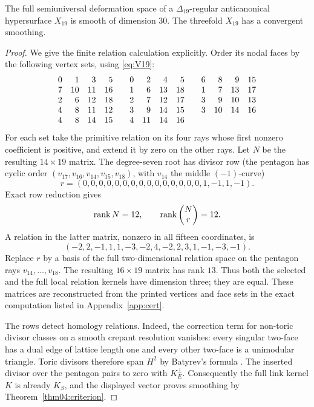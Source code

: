 \begin{corollary}\label{cor:x19smooth}
The full semiuniversal deformation space of a $\Delta_{19}$-regular
anticanonical hypersurface $X_{19}$ is smooth of dimension $30$.
The threefold $X_{19}$ has a convergent smoothing.
\end{corollary}

\begin{proof}
We give the finite relation calculation explicitly.  Order its nodal
faces by the following vertex sets, using \eqref{eq:V19}:
\[
\begin{array}{rrrr@{\qquad}rrrr@{\qquad}rrrr}
0&1&3&5&0&2&4&5&6&8&9&15\\
7&10&11&16&1&6&13&18&1&7&13&17\\
2&6&12&18&2&7&12&17&3&9&10&13\\
4&8&11&12&3&9&14&15&3&10&14&16\\
4&8&14&15&4&11&14&16&&&&
\end{array}
\]
For each set take the primitive relation on its four rays whose
first nonzero coefficient is positive, and extend it by zero on the
other rays.  Let $N$ be the resulting $14\times19$ matrix.  The
degree-seven root has divisor row (the pentagon has cyclic order
$(v_{17},v_{16},v_{14},v_{15},v_{18})$, with $v_{14}$ the middle $(-1)$-curve)
\[
 r=(0,0,0,0,0,0,0,0,0,0,0,0,0,0,0,1,-1,1,-1).
\]
Exact row reduction gives
\[
 \operatorname{rank} N=12,\qquad \operatorname{rank}\begin{pmatrix}N\\r\end{pmatrix}=12.
\]
A relation in the latter matrix, nonzero in all fifteen coordinates, is
\[
 (-2,2,-1,1,1,-3,-2,4,-2,2,3,1,-1,-3,-1).
\]
Replace $r$ by a basis of the full two-dimensional relation space
on the pentagon rays $v_{14},\ldots,v_{18}$.  The resulting
$16\times19$ matrix has rank $13$.  Thus both the selected and the
full local relation kernels have dimension three; they are equal.
These matrices are reconstructed from the printed vertices and face
sets in the exact computation listed in Appendix~\ref{app:cert}.

The rows detect homology relations.  Indeed, the correction term for
non-toric divisor classes on a smooth crepant resolution vanishes:
every singular two-face has a dual edge of lattice length one and
every other two-face is a unimodular triangle.  Toric divisors
therefore span $H^2$ by Batyrev's formula \cite{Batyrev94}.  The
inserted divisor over the pentagon pairs to zero with $K_E^\perp$.
Consequently the full link kernel $K$ is already $K_S$, and the
displayed vector proves smoothing by Theorem~\ref{thm04:criterion}.


\end{proof}
